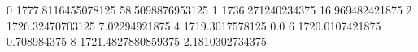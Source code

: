 0 1777.8116455078125 58.5098876953125
1 1736.271240234375 16.969482421875
2 1726.32470703125 7.02294921875
4 1719.3017578125 0.0
6 1720.0107421875 0.708984375
8 1721.4827880859375 2.1810302734375
